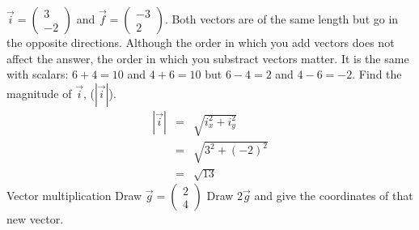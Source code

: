 \documentclass[a4paper]{report}
\begin{document}
\begin{Answer}[ref=exVEC]
\begin{center}
\begin{tikzpicture}[scale=0.5]
\end{tikzpicture}
\end{center}
$\vec{i} = \begin{pmatrix}
3 \\
-2 
\end{pmatrix}$ and $\vec{f} = \begin{pmatrix}
-3 \\
2 
\end{pmatrix}$. Both vectors are of the same length but go in the opposite directions. Although the order in which you add vectors does not affect the answer, the order in which you substract vectors matter. It is the same with scalars: $6+4=10$ and $4+6=10$ but $6-4=2$ and $4-6=-2$.  
\subQuestion Find the magnitude of $\vec{i}$, ($|\vec{i}|$).
\begin{eqnarray}
|\vec{i}|&=&\sqrt{i^2_x+i^2_y}\\
&=&\sqrt{3^2+(-2)^2}\\
&=&\sqrt{13}
\end{eqnarray}
\Question Vector multiplication
\subQuestion Draw $\vec{g} = \begin{pmatrix}
2 \\
4 
\end{pmatrix}$ 
\subQuestion Draw $2\vec{g}$ and give the coordinates of that new vector.
\begin{center}

\end{center}
\end{Answer}
\end{document}
